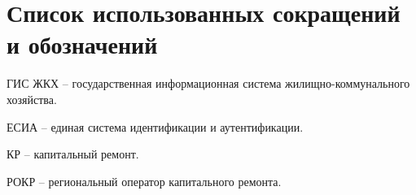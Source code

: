 \section*{Список использованных сокращений и обозначений}

ГИС ЖКХ -- государственная информационная система жилищно-коммунального хозяйства.

ЕСИА -- единая система идентификации и аутентификации.

КР -- капитальный ремонт.

РОКР -- региональный оператор капитального ремонта.

\clearpage
\newpage